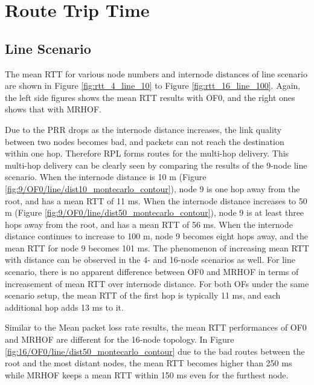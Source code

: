 \section{Route Trip Time}
\label{rtt}
 
\subsection{Line Scenario}
\label{rtt:line}

The mean RTT for various node numbers and internode distances of line scenario are shown in Figure \ref{fig:rtt_4_line_10} to Figure \ref{fig:rtt_16_line_100}. Again, the left side figures shows the mean RTT results with OF0, and the right ones shows that with MRHOF.

Due to the PRR drops as the internode distance increases, the link quality between two nodes becomes bad, and packets can not reach the destination within one hop. Therefore RPL forms routes for the multi-hop delivery. This multi-hop delivery can be clearly seen by comparing the results of the 9-node line scenario. When the internode distance is 10 m (Figure \ref{fig:9/OF0/line/dist10_montecarlo_contour}), node 9 is one hop away from the root, and has a mean RTT of 11 ms. When the internode distance increases to 50 m (Figure \ref{fig:9/OF0/line/dist50_montecarlo_contour}), node 9 is at least three hops away from the root, and has a mean RTT of 56 ms. When the internode distance continues to increase to 100 m, node 9 becomes eight hops away, and the mean RTT for node 9 becomes 101 ms. The phenomenon of increasing mean RTT with distance can be observed in the 4- and 16-node scenarios as well. For line scenario, there is no apparent difference between OF0 and MRHOF in terms of increasement of mean RTT over internode distance. For both OFs under the same scenario setup, the mean RTT of the first hop is typically 11 ms, and each additional hop adds 13 ms to it.

Similar to the Mean packet loss rate results, the mean RTT performances of OF0 and MRHOF are different for the 16-node topology. In Figure \ref{fig:16/OF0/line/dist50_montecarlo_contour} due to the bad routes between the root and the most distant nodes, the mean RTT becomes higher than 250 ms while MRHOF keeps a mean RTT within 150 ms even for the furthest node.

